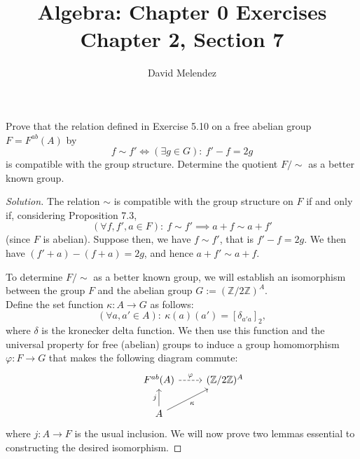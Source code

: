 \documentclass[12pt]{article}
\newenvironment{problem}[2][Problem]{\begin{trivlist}
\item[\hskip \labelsep {\bfseries #1}\hskip \labelsep {\bfseries #2.}]}{\end{trivlist}}
\newenvironment{solution}
  {\renewcommand\qedsymbol{$\blacksquare$}\begin{proof}[Solution]}
{\end{proof}}
\begin{document}
\title{Algebra: Chapter 0 Exercises\\ \large Chapter 2, Section 7}
\author{David Melendez}
\maketitle

\begin{problem}{7.4}
  Prove that the relation defined in Exercise 5.10 on a free abelian group $F = F^{ab}(A)$ by 
  \begin{equation*}
    f \sim f' \Leftrightarrow (\exists g\in G): ~ f'-f = 2g
  \end{equation*}
  is compatible with the group structure.
  Determine the quotient $F/{\sim}$ as a better known group.
\end{problem}
\begin{solution}
  The relation $\sim$ is compatible with the group structure on $F$ if and only if, considering 
  Proposition 7.3,
  \begin{equation*}
    (\forall f,f',a\in F): ~ f\sim f'\implies a+f\sim a+f' 
  \end{equation*}
  (since $F$ is abelian).
  Suppose then, we have $f\sim f'$, that is $f' - f = 2g$.
  We then have $(f' + a) - (f + a) = 2g$, and hence $a+f'\sim a+f$.

  To determine $F/{\sim}$ as a better known group, we will establish an isomorphism between the group $F$ and the abelian group 
  $G := (\mathbb{Z}/2\mathbb{Z})^A$. \\
  Define the set function $\kappa : A\to G$ as follows:
  \begin{equation*}
    (\forall a,a'\in A):~ \kappa(a)(a') = [\delta_{a'a}]_2,
  \end{equation*}
  where $\delta$ is the kronecker delta function.
  We then use this function and the universal property for free (abelian) groups to induce a group
  homomorphism $\varphi : F\to G$ that makes the following diagram commute:
  \[ \begin{tikzcd}
    & F^{ab}(A) \ar[dashed]{r}{\varphi} & (\mathbb{Z}/2\mathbb{Z})^A \\
    & A \ar{u}{j} \ar{ur}[swap]{\kappa}
  \end{tikzcd} \]
  where $j : A\to F$ is the usual inclusion.
  We will now prove two lemmas essential to constructing the desired isomorphism.

  \newpage


\end{solution}
\end{document}
